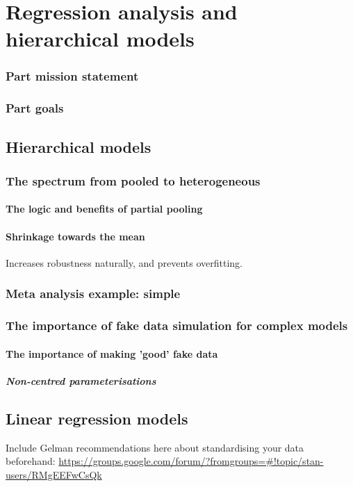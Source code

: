 \documentclass[11pt,fullpage]{book}
\begin{document}
\part{Regression analysis and hierarchical models}\label{part:regressionHierarchical}
\section{Part mission statement}
\section{Part goals}

\chapter{Hierarchical models}\label{chap:hierarchicalModels}
\section{The spectrum from pooled to heterogeneous}
\subsection{The logic and benefits of partial pooling}
\subsection{Shrinkage towards the mean}
Increases robustness naturally, and prevents overfitting.

\section{Meta analysis example: simple}

\section{The importance of fake data simulation for complex models}
\subsection{The importance of making 'good' fake data}

\subsubsection{Non-centred parameterisations}


\chapter{Linear regression models}
Include Gelman recommendations here about standardising your data beforehand: \url{https://groups.google.com/forum/?fromgroups=#!topic/stan-users/RMgEEFwCsQk}
\end{document}
